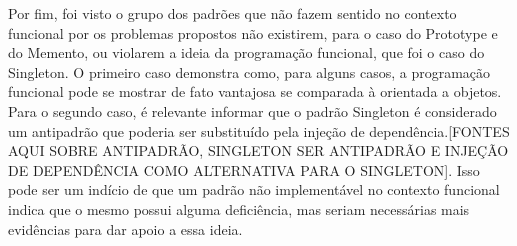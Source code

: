 Por fim, foi visto o grupo dos padrões 
que não fazem sentido no contexto funcional 
por os problemas propostos não existirem, 
para o caso do Prototype e do Memento, ou 
violarem a ideia da programação funcional, 
que foi o caso do Singleton. O primeiro caso 
demonstra como, para alguns casos, a 
programação funcional pode se mostrar 
de fato vantajosa se comparada à orientada 
a objetos. Para o segundo caso, é relevante 
informar que o padrão Singleton é considerado 
um antipadrão que poderia ser substituído 
pela injeção de dependência.[FONTES AQUI SOBRE 
ANTIPADRÃO, SINGLETON SER ANTIPADRÃO E 
INJEÇÃO DE DEPENDÊNCIA COMO ALTERNATIVA PARA 
O SINGLETON]. Isso pode ser um indício 
de que um padrão não implementável no contexto 
funcional indica que o mesmo possui alguma 
deficiência, mas seriam necessárias 
mais evidências para dar apoio a essa ideia.




